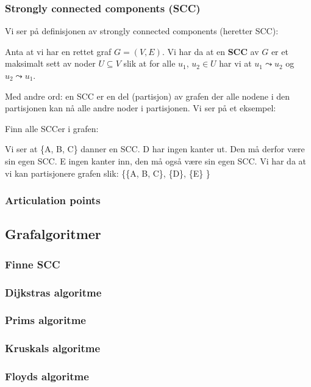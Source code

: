 \subsubsection{Strongly connected components (SCC)}
Vi ser på definisjonen av strongly connected components (heretter SCC):
\begin{definisjon}
Anta at vi har en rettet graf $ G = (V, E) $. Vi har da at en \textbf{SCC} av $ G $ er et maksimalt sett av noder $ U \subseteq V $ slik at for alle $ u_1 $, $ u_{2} \in U $ har vi at $ u_1 \leadsto u_2 $ og $ u_2 \leadsto u_1 $.
\end{definisjon}

Med andre ord: en SCC er en del (partisjon) av grafen der alle nodene i den partisjonen kan nå alle andre noder i partisjonen. Vi ser på et eksempel:

\begin{eks} Finn alle SCCer i grafen:
\begin{figure}[H]
\centering
{}
\end{figure}
Vi ser at \{A, B, C\} danner en SCC. D har ingen kanter ut. Den må derfor være sin egen SCC. E ingen kanter inn, den må også være sin egen SCC. Vi har da at vi kan partisjonere grafen slik: \{\{A, B, C\}, \{D\}, \{E\} \}
\end{eks}

\subsubsection{\color{red}Articulation points}

\subsection{\color{red}Grafalgoritmer}

\subsubsection{\color{red}Finne SCC}

\subsubsection{\color{red}Dijkstras algoritme}
\label{dijkstra}

\subsubsection{\color{red}Prims algoritme}
\label{prim}

\subsubsection{\color{red}Kruskals algoritme}
\label{kruskal}

\subsubsection{\color{red}Floyds algoritme}
\label{floyd}